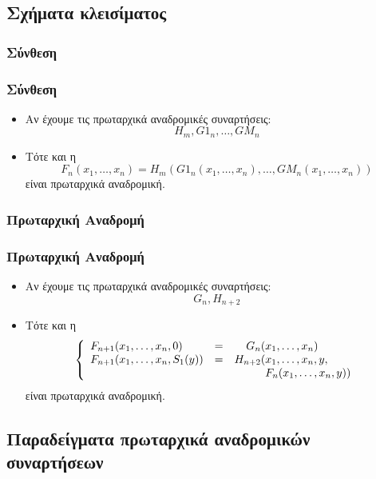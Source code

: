 \documentclass{beamer}
\begin{document}
\subsection{Σχήματα κλεισίματος}

\subsubsection{Σύνθεση}

\begin{frame}
        \frametitle{Σύνθεση}
        \begin{itemize}
                \item Αν έχουμε τις πρωταρχικά αναδρομικές συναρτήσεις: $$H_m, G1_n, \ldots, GM_n$$
                \pause
                \item Τότε και η $$F_n(x_1,\ldots,x_n) = H_m(G1_n(x_1,\ldots,x_n),\ldots,GM_n(x_1,\ldots,x_n))$$
                είναι πρωταρχικά αναδρομική.
        \end{itemize}
\end{frame}

\subsubsection{Πρωταρχική Αναδρομή}

\begin{frame}
        \frametitle{Πρωταρχική Αναδρομή}
        \begin{itemize}
                \item Αν έχουμε τις πρωταρχικά αναδρομικές συναρτήσεις: $$G_n, H_{n+2}$$
                \pause
                \item Τότε και η 
                $$\left\{
                    \begin{array}{llr@{}l}
                      F_{n+1}(x_1,\ldots,x_n, 0)     &=&    G_n(&x_1,\ldots,x_n) \\
                      F_{n+1}(x_1,\ldots,x_n, S_1(y))&=&H_{n+2}(&x_1,\ldots,x_n, y ,\\
                                                     & &        &F_n(x_1,\ldots,x_n, y))
                    \end{array}
                \right.$$
                είναι πρωταρχικά αναδρομική.
        \end{itemize}
\end{frame}

\subsection{Παραδείγματα πρωταρχικά αναδρομικών συναρτήσεων}
\end{document}
